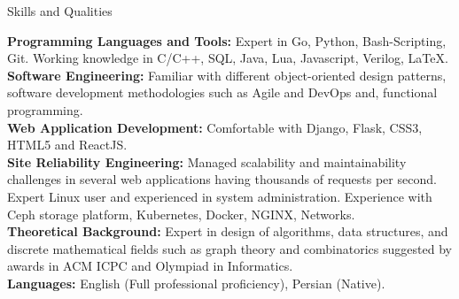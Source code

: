 \documentclass{resume} %
\begin{document}
\begin{rSection}{Skills and Qualities}

	{\bf Programming Languages and Tools:}
	Expert in Go, Python, Bash-Scripting, Git. Working knowledge in C/C++, SQL, Java, Lua, Javascript, Verilog, \LaTeX. \smallskip
	\\
	{\bf Software Engineering:}
	Familiar with different object-oriented design patterns, software development methodologies such as Agile and DevOps and, functional programming.\smallskip
	\\
	{\bf Web Application Development:}
	Comfortable with Django, Flask, CSS3, HTML5 and ReactJS.\smallskip
	\\
	{\bf Site Reliability Engineering:}
	Managed scalability and maintainability challenges in several web applications having thousands of requests per second.
	Expert Linux user and experienced in system administration.
	Experience with Ceph storage platform, Kubernetes, Docker, NGINX, Networks.\smallskip
	\\
	{\bf Theoretical Background:}
	Expert in design of algorithms, data structures, and discrete mathematical fields such as graph theory and combinatorics suggested by awards in ACM ICPC and Olympiad in Informatics.\smallskip
	\\
	{\bf Languages:}
	English (Full professional proficiency), Persian (Native).\smallskip

\end{rSection}
	
\end{document}
